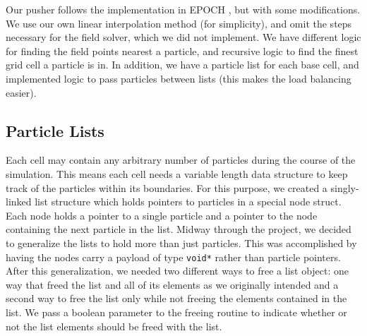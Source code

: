 \documentclass[]{article}
\begin{document}
\begin{figure}[htbp]
\label{fig:boris}
\end{figure}

Our pusher follows the implementation in EPOCH \cite{epoch}, but with some modifications.  We use our own linear interpolation method (for simplicity), and omit the steps necessary for the field solver, which we did not implement.  We have different logic for finding the field points nearest a particle, and recursive logic to find the finest grid cell a particle is in.  In addition, we have a particle list for each base cell, and implemented logic to pass particles between lists (this makes the load balancing easier).

\subsection{Particle Lists}
Each cell may contain any arbitrary number of particles during the course of the simulation. This means each cell needs a variable length data structure to keep track of the particles within its boundaries. For this purpose, we created a singly-linked list structure which holds pointers to particles in a special node struct. Each node holds a pointer to a single particle and a pointer to the node containing the next particle in the list. Midway through the project, we decided to generalize the lists to hold more than just particles. This was accomplished by having the nodes carry a payload of type \texttt{void*} rather than particle pointers. After this generalization, we needed two different ways to free a list object: one way that freed the list and all of its elements as we originally intended and a second way to free the list only while not freeing the elements contained in the list. We pass a boolean parameter to the freeing routine to indicate whether or not the list elements should be freed with the list.
\end{document}
